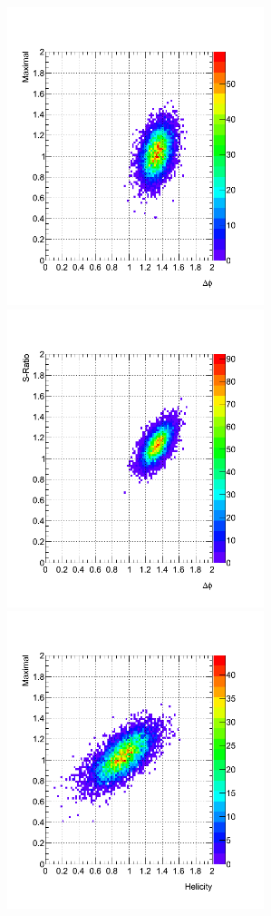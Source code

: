 \begin{figure}[htpb!]
\begin{center}
\includegraphics[width=75mm]{f/correlation_dphi_op}
\includegraphics[width=75mm]{f/correlation_dphi_sratio}
\includegraphics[width=75mm]{f/correlation_hb_op}

\end{center}
\end{figure}

